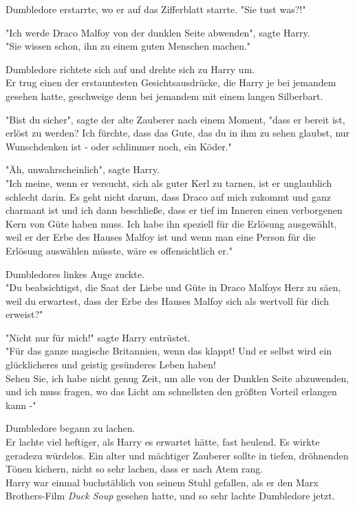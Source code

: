 {Dumbledore erstarrte, wo er auf das Zifferblatt starrte. "Sie tust was?!"

"Ich werde Draco Malfoy von der dunklen Seite abwenden", sagte Harry.\\ "Sie wissen schon, ihn zu einem guten Menschen machen."

Dumbledore richtete sich auf und drehte sich zu Harry um.\\ Er trug einen der erstauntesten Gesichtsausdrücke, die Harry je bei jemandem gesehen hatte, geschweige denn bei jemandem mit einem langen Silberbart.

"Bist du sicher", sagte der alte Zauberer nach einem Moment, "dass er bereit ist, erlöst zu werden? Ich fürchte, dass das Gute, das du in ihm zu sehen glaubst, nur Wunschdenken ist - oder schlimmer noch, ein Köder."

"Äh, unwahrscheinlich", sagte Harry.\\ "Ich meine, wenn er versucht, sich als guter Kerl zu tarnen, ist er unglaublich schlecht darin. Es geht nicht darum, dass Draco auf mich zukommt und ganz charmant ist und ich dann beschließe, dass er tief im Inneren einen verborgenen Kern von Güte haben muss. Ich habe ihn speziell für die Erlösung ausgewählt, weil er der Erbe des Hauses Malfoy ist und wenn man eine Person für die Erlösung auswählen müsste, wäre es offensichtlich er."

Dumbledores linkes Auge zuckte.\\ "Du beabsichtigst, die Saat der Liebe und Güte in Draco Malfoys Herz zu säen, weil du erwartest, dass der Erbe des Hauses Malfoy sich als wertvoll für dich erweist?"

"Nicht nur für mich!" sagte Harry entrüstet.\\ "Für das ganze magische Britannien, wenn das klappt! Und er selbst wird ein glücklicheres und geistig gesünderes Leben haben!\\ Sehen Sie, ich habe nicht genug Zeit, um alle von der Dunklen Seite abzuwenden, und ich muss fragen, wo das Licht am schnellsten den größten Vorteil erlangen kann -"

Dumbledore begann zu lachen.\\ Er lachte viel heftiger, als Harry es erwartet hätte, fast heulend. Es wirkte geradezu würdelos. Ein alter und mächtiger Zauberer sollte in tiefen, dröhnenden Tönen kichern, nicht so sehr lachen, dass er nach Atem rang.\\ Harry war einmal buchstäblich von seinem Stuhl gefallen, als er den Marx Brothers-Film \emph{Duck Soup} gesehen hatte, und so sehr lachte Dumbledore jetzt.

}
